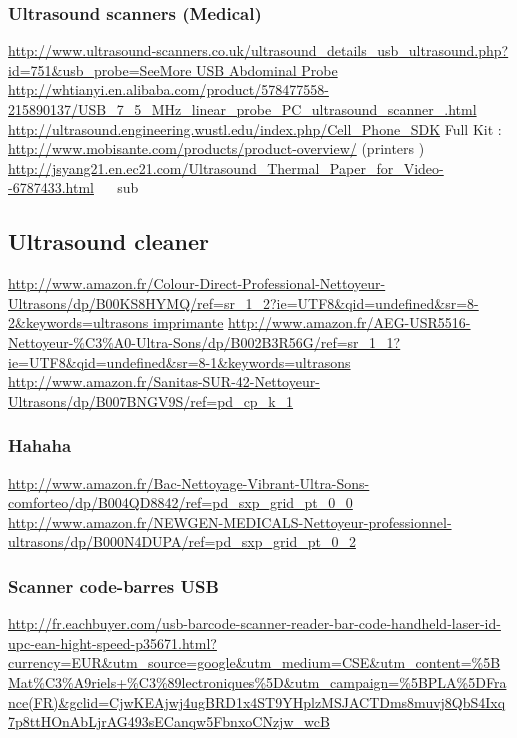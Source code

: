 \subsubsection {Ultrasound scanners (Medical)}
\url{http://www.ultrasound-scanners.co.uk/ultrasound_details_usb_ultrasound.php?id=751&usb_probe=SeeMore
USB Abdominal Probe}
\url{http://whtianyi.en.alibaba.com/product/578477558-215890137/USB_7_5_MHz_linear_probe_PC_ultrasound_scanner_.html}
\url{http://ultrasound.engineering.wustl.edu/index.php/Cell_Phone_SDK}
Full Kit : \url{http://www.mobisante.com/products/product-overview/}
(printers )
\url{http://jsyang21.en.ec21.com/Ultrasound_Thermal_Paper_for_Video--6787433.html}
~
~sub\subsection {Ultrasound cleaner}
\url{http://www.amazon.fr/Colour-Direct-Professional-Nettoyeur-Ultrasons/dp/B00KS8HYMQ/ref=sr_1_2?ie=UTF8&qid=undefined&sr=8-2&keywords=ultrasons
imprimante}
\href{http://www.amazon.fr/AEG-USR5516-Nettoyeur-?-Ultra-Sons/dp/B002B3R56G/ref=sr_1_1?ie=UTF8&qid=undefined&sr=8-1&keywords=ultrasons}{http://www.amazon.fr/AEG-USR5516-Nettoyeur-\%C3\%A0-Ultra-Sons/dp/B002B3R56G/ref=sr\_1\_1?ie=UTF8\&qid=undefined\&sr=8-1\&keywords=ultrasons}
\url{http://www.amazon.fr/Sanitas-SUR-42-Nettoyeur-Ultrasons/dp/B007BNGV9S/ref=pd_cp_k_1}
~
\subsubsection {Hahaha}
\url{http://www.amazon.fr/Bac-Nettoyage-Vibrant-Ultra-Sons-comforteo/dp/B004QD8842/ref=pd_sxp_grid_pt_0_0}
\url{http://www.amazon.fr/NEWGEN-MEDICALS-Nettoyeur-professionnel-ultrasons/dp/B000N4DUPA/ref=pd_sxp_grid_pt_0_2}
~
\subsubsection {Scanner code-barres USB}

\href{http://fr.eachbuyer.com/usb-barcode-scanner-reader-bar-code-handheld-laser-id-upc-ean-hight-speed-p35671.html?currency=EUR&utm_source=google&utm_medium=CSE&utm_content=[Mat?riels
?lectroniques]&utm_campaign=[PLA]France(FR)&gclid=CjwKEAjwj4ugBRD1x4ST9YHplzMSJACTDms8muvj8QbS4Ixq7p8ttHOnAbLjrAG493sECanqw5FbnxoCNzjw_wcB}{http://fr.eachbuyer.com/usb-barcode-scanner-reader-bar-code-handheld-laser-id-upc-ean-hight-speed-p35671.html?currency=EUR\&utm\_source=google\&utm\_medium=CSE\&utm\_content=\%5BMat\%C3\%A9riels+\%C3\%89lectroniques\%5D\&utm\_campaign=\%5BPLA\%5DFrance(FR)\&gclid=CjwKEAjwj4ugBRD1x4ST9YHplzMSJACTDms8muvj8QbS4Ixq7p8ttHOnAbLjrAG493sECanqw5FbnxoCNzjw\_wcB}
~
